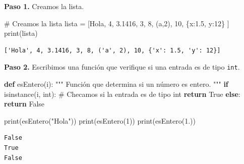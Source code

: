 \documentclass[
  spanish,
  letterpaper,
]{scrbook}
\newenvironment{Shaded}{\begin{snugshade}}{\end{snugshade}}
\newcommand{\BuiltInTok}[1]{\textcolor[rgb]{0.00,0.23,0.31}{#1}}
\newcommand{\CommentTok}[1]{\textcolor[rgb]{0.37,0.37,0.37}{#1}}
\newcommand{\ControlFlowTok}[1]{\textcolor[rgb]{0.00,0.23,0.31}{\textbf{#1}}}
\newcommand{\DecValTok}[1]{\textcolor[rgb]{0.68,0.00,0.00}{#1}}
\newcommand{\FloatTok}[1]{\textcolor[rgb]{0.68,0.00,0.00}{#1}}
\newcommand{\KeywordTok}[1]{\textcolor[rgb]{0.00,0.23,0.31}{\textbf{#1}}}
\newcommand{\NormalTok}[1]{\textcolor[rgb]{0.00,0.23,0.31}{#1}}
\newcommand{\OperatorTok}[1]{\textcolor[rgb]{0.37,0.37,0.37}{#1}}
\newcommand{\StringTok}[1]{\textcolor[rgb]{0.13,0.47,0.30}{#1}}
\newcommand{\VariableTok}[1]{\textcolor[rgb]{0.07,0.07,0.07}{#1}}
\theoremstyle{definition}
\theoremstyle{remark}
\begin{document}
\textbf{Paso 1.} Creamos la lista.

\begin{Shaded}
\begin{Highlighting}[]
\CommentTok{\# Creamos la lista}
\NormalTok{lista }\OperatorTok{=}\NormalTok{ [}\StringTok{\textquotesingle{}Hola\textquotesingle{}}\NormalTok{, }\DecValTok{4}\NormalTok{, }\FloatTok{3.1416}\NormalTok{, }\DecValTok{3}\NormalTok{, }\DecValTok{8}\NormalTok{, (}\StringTok{\textquotesingle{}a\textquotesingle{}}\NormalTok{,}\DecValTok{2}\NormalTok{), }\DecValTok{10}\NormalTok{, \{}\StringTok{\textquotesingle{}x\textquotesingle{}}\NormalTok{:}\FloatTok{1.5}\NormalTok{, }\StringTok{\textquotesingle{}y\textquotesingle{}}\NormalTok{:}\DecValTok{12}\NormalTok{\} ]}
\BuiltInTok{print}\NormalTok{(lista)}
\end{Highlighting}
\end{Shaded}

\begin{verbatim}
['Hola', 4, 3.1416, 3, 8, ('a', 2), 10, {'x': 1.5, 'y': 12}]
\end{verbatim}

\textbf{Paso 2.} Escribimos una función que verifique si una entrada es
de tipo \texttt{int}.

\begin{Shaded}
\begin{Highlighting}[]
\KeywordTok{def}\NormalTok{ esEntero(i):}
    \CommentTok{"""}
\CommentTok{    Función que determina si un número es entero.}
\CommentTok{    """}
    \ControlFlowTok{if} \BuiltInTok{isinstance}\NormalTok{(i, }\BuiltInTok{int}\NormalTok{): }\CommentTok{\# Checamos si la entrada es de tipo int}
        \ControlFlowTok{return} \VariableTok{True}
    \ControlFlowTok{else}\NormalTok{:}
        \ControlFlowTok{return} \VariableTok{False}
\end{Highlighting}
\end{Shaded}

\begin{Shaded}
\begin{Highlighting}[]
\BuiltInTok{print}\NormalTok{(esEntero(}\StringTok{"Hola"}\NormalTok{))}
\BuiltInTok{print}\NormalTok{(esEntero(}\DecValTok{1}\NormalTok{))}
\BuiltInTok{print}\NormalTok{(esEntero(}\FloatTok{1.}\NormalTok{))}
\end{Highlighting}
\end{Shaded}

\begin{verbatim}
False
True
False
\end{verbatim}
\end{document}
